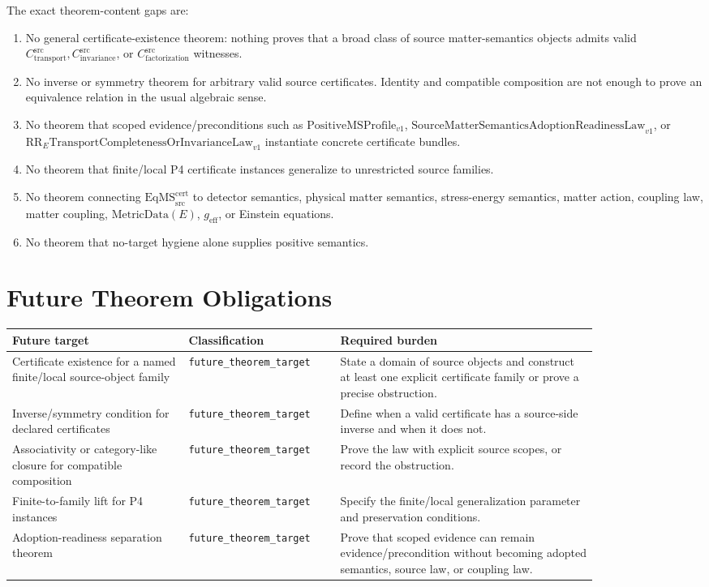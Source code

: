 \documentclass[11pt]{article}
\newcommand{\EqMScert}{\mathrm{EqMS}^{\mathrm{cert}}_{\mathrm{src}}}
\newcommand{\CTr}{C_{\mathrm{transport}}^{\mathrm{src}}}
\newcommand{\CInv}{C_{\mathrm{invariance}}^{\mathrm{src}}}
\newcommand{\CFact}{C_{\mathrm{factorization}}^{\mathrm{src}}}
\newcommand{\RRELaw}{\mathrm{RR}_{E}\mathrm{TransportCompletenessOrInvarianceLaw}_{v1}}
\newcommand{\PositiveMSProfile}{\mathrm{PositiveMSProfile}_{v1}}
\newcommand{\SMSAR}{\mathrm{SourceMatterSemanticsAdoptionReadinessLaw}_{v1}}
\newcommand{\MetricData}{\mathrm{MetricData}}
\newcommand{\geff}{g_{\mathrm{eff}}}
\begin{document}
The exact theorem-content gaps are:

\begin{enumerate}[label=\textbf{G\arabic*.},leftmargin=*]
  \item No general certificate-existence theorem: nothing proves that a broad
  class of source matter-semantics objects admits valid \(\CTr,\CInv\), or
  \(\CFact\) witnesses.
  \item No inverse or symmetry theorem for arbitrary valid source
  certificates. Identity and compatible composition are not enough to prove an
  equivalence relation in the usual algebraic sense.
  \item No theorem that scoped evidence/preconditions such as
  \(\PositiveMSProfile\), \(\SMSAR\), or \(\RRELaw\) instantiate concrete
  certificate bundles.
  \item No theorem that finite/local P4 certificate instances generalize to
  unrestricted source families.
  \item No theorem connecting \(\EqMScert\) to detector semantics,
  physical matter semantics, stress-energy semantics, matter action, coupling
  law, matter coupling, \(\MetricData(E)\), \(\geff\), or Einstein equations.
  \item No theorem that no-target hygiene alone supplies positive semantics.
\end{enumerate}

\section{Future Theorem Obligations}

\begin{longtable}{p{0.26\linewidth}p{0.20\linewidth}p{0.38\linewidth}}
\toprule
Future target & Classification & Required burden \\
\midrule
Certificate existence for a named finite/local source-object family &
\texttt{future\_theorem\_target} &
State a domain of source objects and construct at least one explicit
certificate family or prove a precise obstruction. \\
Inverse/symmetry condition for declared certificates &
\texttt{future\_theorem\_target} &
Define when a valid certificate has a source-side inverse and when it does not. \\
Associativity or category-like closure for compatible composition &
\texttt{future\_theorem\_target} &
Prove the law with explicit source scopes, or record the obstruction. \\
Finite-to-family lift for P4 instances &
\texttt{future\_theorem\_target} &
Specify the finite/local generalization parameter and preservation conditions. \\
Adoption-readiness separation theorem &
\texttt{future\_theorem\_target} &
Prove that scoped evidence can remain evidence/precondition without becoming
adopted semantics, source law, or coupling law. \\
\bottomrule
\end{longtable}
\end{document}
